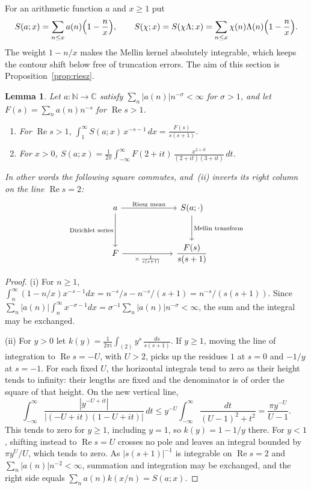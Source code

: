 \documentclass[screen,reqno]{aomart}
\numberwithin{equation}{section}
\newtheorem{lemma}[theorem]{Lemma}
\theoremstyle{definition}
\renewcommand{\Re}{\operatorname{Re}}
\newcommand{\C}{\mathbb{C}}
\begin{document}
For an arithmetic function $a$ and $x\ge1$ put
\[
  S(a;x)=\sum_{n\le x}a(n)\Bigl(1-\frac nx\Bigr),\qquad
  S(\chi;x)=S(\chi\Lambda;x)=\sum_{n\le x}\chi(n)\Lambda(n)\Bigl(1-\frac nx\Bigr).
\]
The weight $1-n/x$ makes the Mellin kernel absolutely integrable, which keeps the contour shift
below free of truncation errors. The aim of this section is Proposition~\ref{prop:riesz}.

\begin{lemma}\label{lem:mellin}
Let $a\colon\mathbb N\to\C$ satisfy $\sum_n|a(n)|n^{-\sigma}<\infty$ for $\sigma>1$, and let
$F(s)=\sum_na(n)n^{-s}$ for $\Re s>1$.
\begin{enumerate}
\item[(i)] For $\Re s>1$, $\displaystyle\int_1^\infty S(a;x)\,x^{-s-1}\,dx=\frac{F(s)}{s(s+1)}$.
\item[(ii)] For $x>0$, $\displaystyle S(a;x)=\frac1{2\pi}\int_{-\infty}^{\infty}
F(2+it)\,\frac{x^{2+it}}{(2+it)(3+it)}\,dt$.
\end{enumerate}
In other words the following square commutes, and~(ii) inverts its right column on the line
$\Re s=2$:
\[
\begin{tikzcd}[column sep=6em,row sep=3em]
a \arrow[r,"\text{Riesz mean}"] \arrow[d,"\text{Dirichlet series}"'] &
S(a;\cdot) \arrow[d,"\text{Mellin transform}"] \\
F \arrow[r,"\times\,\frac1{s(s+1)}"'] & \dfrac{F(s)}{s(s+1)}
\end{tikzcd}
\]
\end{lemma}

\begin{proof}
(i) For $n\ge1$, $\int_n^\infty(1-n/x)x^{-s-1}dx=n^{-s}/s-n^{-s}/(s+1)=n^{-s}/(s(s+1))$. Since
$\sum_n|a(n)|\int_n^\infty x^{-\sigma-1}dx=\sigma^{-1}\sum_n|a(n)|n^{-\sigma}<\infty$, the sum
and the integral may be exchanged.

(ii) For $y>0$ let $k(y)=\frac1{2\pi i}\int_{(2)}y^s\,\frac{ds}{s(s+1)}$. If $y\ge1$, moving the
line of integration to $\Re s=-U$, with $U>2$, picks up the residues $1$ at $s=0$ and
$-1/y$ at $s=-1$. For each fixed $U$, the horizontal integrals tend to zero as their
height tends to infinity: their lengths are fixed and the denominator is of order
the square of that height. On the new vertical line,
\[
 \int_{-\infty}^{\infty}\frac{|y^{-U+it}|}{|(-U+it)(1-U+it)|}\,dt
 \le y^{-U}\int_{-\infty}^{\infty}\frac{dt}{(U-1)^2+t^2}
 =\frac{\pi y^{-U}}{U-1}.
\]
This tends to zero for $y\ge1$, including $y=1$, so $k(y)=1-1/y$ there.
For $y<1$, shifting instead to $\Re s=U$ crosses no pole and leaves an integral
bounded by $\pi y^U/U$, which tends to zero. As
$|s(s+1)|^{-1}$ is integrable on $\Re s=2$ and $\sum_n|a(n)|n^{-2}<\infty$, summation and
integration may be exchanged, and the right side equals $\sum_na(n)k(x/n)=S(a;x)$.
\end{proof}
\end{document}
